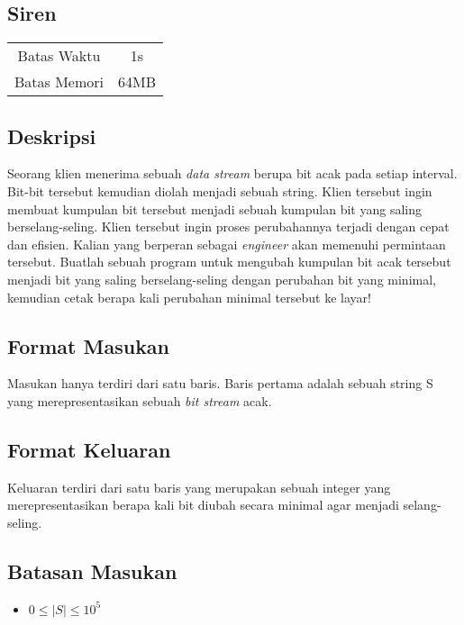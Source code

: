 \documentclass{article}
\begin{document}
\begin{center}
    \section*{Siren} %

    \begin{tabular}{ | c c | }
        \hline
        Batas Waktu  & 1s \\    %
        Batas Memori & 64MB \\  %
        \hline
    \end{tabular}
\end{center}

\subsection*{Deskripsi}
Seorang klien menerima sebuah {\it data stream} berupa bit acak pada setiap interval. Bit-bit tersebut kemudian diolah menjadi sebuah string. Klien tersebut ingin membuat kumpulan bit tersebut menjadi sebuah kumpulan bit yang saling berselang-seling. Klien tersebut ingin proses perubahannya terjadi dengan cepat dan efisien. Kalian yang berperan sebagai {\it engineer} akan memenuhi permintaan tersebut. Buatlah sebuah program untuk mengubah kumpulan bit acak tersebut menjadi bit yang saling berselang-seling dengan perubahan bit yang minimal, kemudian cetak berapa kali perubahan minimal tersebut ke layar!

\subsection*{Format Masukan}
Masukan hanya terdiri dari satu baris. Baris pertama adalah sebuah string S yang merepresentasikan sebuah {\it bit stream} acak.

\subsection*{Format Keluaran}
Keluaran terdiri dari satu baris yang merupakan sebuah integer yang merepresentasikan berapa kali bit diubah secara minimal agar menjadi selang-seling.

\subsection*{Batasan Masukan}
\begin{itemize}
 \item $0 \leq |S|  \leq 10^5$
\end{itemize}
\end{document}
